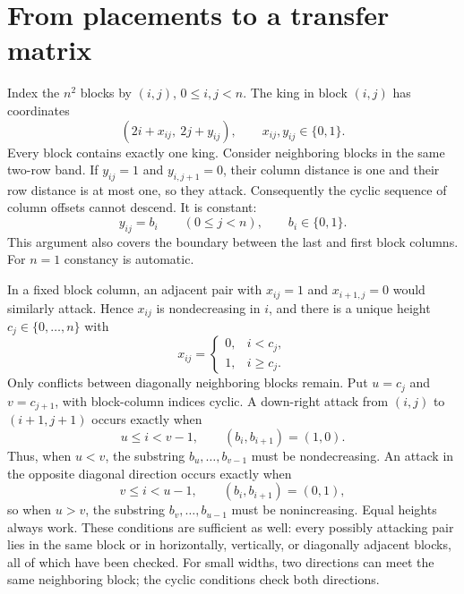 \documentclass[11pt,letterpaper]{article}
\numberwithin{equation}{section}
\theoremstyle{remark}\newtheorem{remark}[theorem]{Remark}
\begin{document}
\section{From placements to a transfer matrix}\label{mdk:sq:sec:geometry}
Index the $n^2$ blocks by $(i,j)$, $0\le i,j<n$. The king in block $(i,j)$ has coordinates
\[
(2i+x_{ij},\ 2j+y_{ij}),\qquad x_{ij},y_{ij}\in\{0,1\}.
\]
Every block contains exactly one king. Consider neighboring blocks in the same two-row band. If $y_{ij}=1$ and $y_{i,j+1}=0$, their column distance is one and their row distance is at most one, so they attack. Consequently the cyclic sequence of column offsets cannot descend. It is constant:
\begin{equation}\label{mdk:sq:eq:b}
y_{ij}=b_i\qquad(0\le j<n),\qquad b_i\in\{0,1\}.
\end{equation}
This argument also covers the boundary between the last and first block columns. For $n=1$ constancy is automatic.

In a fixed block column, an adjacent pair with $x_{ij}=1$ and $x_{i+1,j}=0$ would similarly attack. Hence $x_{ij}$ is nondecreasing in $i$, and there is a unique height $c_j\in\{0,\ldots,n\}$ with
\begin{equation}\label{mdk:sq:eq:c}
x_{ij}=\begin{cases}0,&i<c_j,\\1,&i\ge c_j.\end{cases}
\end{equation}
Only conflicts between diagonally neighboring blocks remain. Put $u=c_j$ and $v=c_{j+1}$, with block-column indices cyclic. A down-right attack from $(i,j)$ to $(i+1,j+1)$ occurs exactly when
\[
u\le i<v-1,\qquad (b_i,b_{i+1})=(1,0).
\]
Thus, when $u<v$, the substring $b_u,\ldots,b_{v-1}$ must be nondecreasing. An attack in the opposite diagonal direction occurs exactly when
\[
v\le i<u-1,\qquad (b_i,b_{i+1})=(0,1),
\]
so when $u>v$, the substring $b_v,\ldots,b_{u-1}$ must be nonincreasing. Equal heights always work. These conditions are sufficient as well: every possibly attacking pair lies in the same block or in horizontally, vertically, or diagonally adjacent blocks, all of which have been checked. For small widths, two directions can meet the same neighboring block; the cyclic conditions check both directions.
\end{document}
